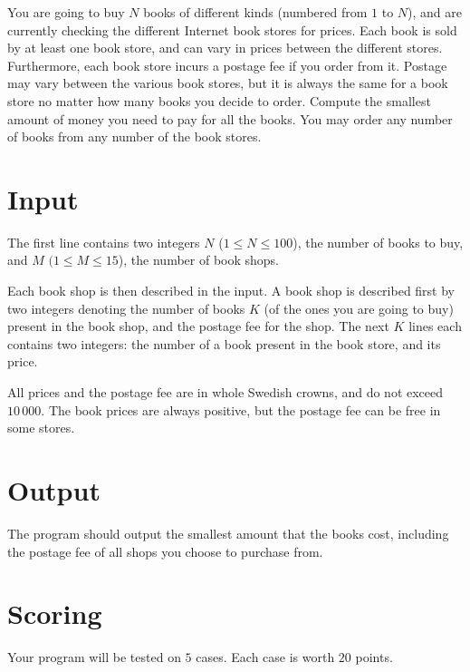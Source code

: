You are going to buy $N$ books of different kinds (numbered from $1$ to $N$), and are currently checking the different Internet book stores for prices.
Each book is sold by at least one book store, and can vary in prices between the different stores.
Furthermore, each book store incurs a postage fee if you order from it.
Postage may vary between the various book stores, but it is always the same for a book store no matter how many books you decide to order.
Compute the smallest amount of money you need to pay for all the books.
You may order any number of books from any number of the book stores.

\section*{Input}
The first line contains two integers $N$ ($1 \le N \le 100$), the number of books to buy, and $M$ $(1 \le M \le 15$), the number of book shops.

Each book shop is then described in the input.
A book shop is described first by two integers denoting the number of books $K$ (of the ones you are going to buy) present in the book shop, and the postage fee for the shop.
The next $K$ lines each contains two integers: the number of a book present in the book store, and its price.

All prices and the postage fee are in whole Swedish crowns, and do not exceed $10\,000$.
The book prices are always positive, but the postage fee can be free in some stores.

\section*{Output}
The program should output the smallest amount that the books cost, including the postage fee of all shops you choose to purchase from.

\section*{Scoring}
Your program will be tested on $5$ cases.
Each case is worth $20$ points.
